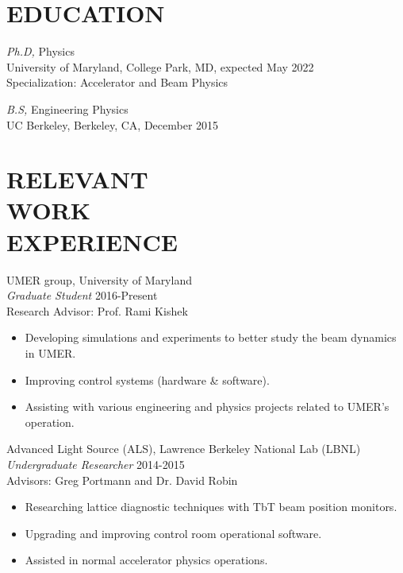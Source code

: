 \documentclass[line,margin]{res}
\begin{document}
\address{4708 \#203 Cherokee st, College Park, MD, 20740}
\address{email: levondov@umd.edu | phone: (818) 319 3797}

 
\begin{resume}
 
 
\section{EDUCATION} {\sl Ph.D,} Physics \\
                    University of Maryland, College Park, MD,
                    expected May 2022 \\
                    Specialization: Accelerator and Beam Physics


                {\sl B.S,} Engineering Physics \\
                UC Berkeley, Berkeley, CA, 
                December 2015 \\
 
\section{RELEVANT \\ WORK \\ EXPERIENCE} 
                UMER group, University of Maryland \\
                {\sl Graduate Student} \hfill 2016-Present \\
                Research Advisor: Prof. Rami Kishek
                 \begin{itemize}  \itemsep -2pt %
                 \item Developing simulations and experiments to better study the beam dynamics in UMER.
                 \item Improving control systems (hardware \& software).
                 \item Assisting with various engineering and physics projects related to UMER's operation.
                \end{itemize}
 
                Advanced Light Source (ALS), Lawrence Berkeley National Lab (LBNL) \\
                {\sl Undergraduate Researcher} \hfill 2014-2015 \\
                Advisors: Greg Portmann and Dr. David Robin
                 \begin{itemize}  \itemsep -2pt %
                 \item Researching lattice diagnostic techniques with TbT beam position monitors.
                 \item Upgrading and improving control room operational software.
                 \item Assisted in normal accelerator physics operations.
                 \end{itemize} 
                 

\end{resume}
\end{document}
